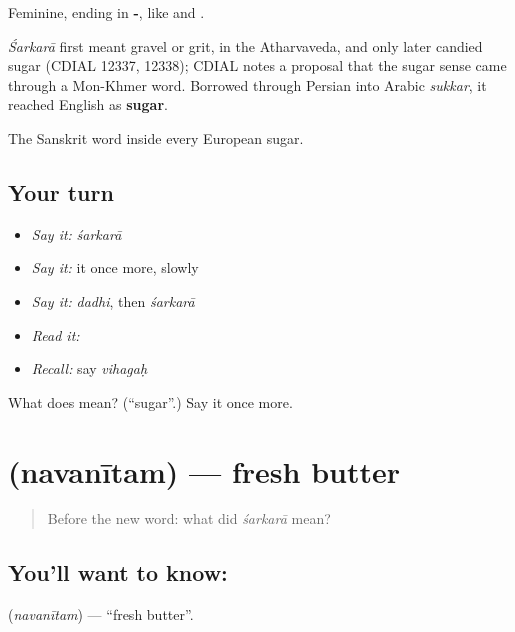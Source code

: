 Feminine, ending in \textbf{-}, like  and .

\begin{cousinweb}
\emph{Śarkarā} first meant gravel or grit, in the Atharvaveda, and only later candied sugar (CDIAL 12337, 12338); CDIAL notes a proposal that the sugar sense came through a Mon-Khmer word. Borrowed through Persian into Arabic \emph{sukkar}, it reached English as \textbf{sugar}.
\end{cousinweb}

\begin{grammarlens}[title={What you've built}]
The Sanskrit word inside every European sugar.
\end{grammarlens}

\subsection*{Your turn}
\begin{itemize}
\raggedright
  \item \emph{Say it:} \emph{śarkarā}
  \item \emph{Say it:} it once more, slowly
  \item \emph{Say it:} \emph{dadhi}, then \emph{śarkarā}
  \item \emph{Read it:} \textbf{}
  \item \emph{Recall:} say \emph{vihagaḥ}
\end{itemize}

\begin{tcolorbox}[breakable,colback=teal!4,colframe=teal!35!black,title={Before you move on}]
What does  mean? (\textquotedblleft{}sugar\textquotedblright{}.) Say it once more.
\end{tcolorbox}
\section[\texorpdfstring{\sk{नवनीतम्} (navanītam)}{नवनीतम् (navanītam)}]{ (navanītam) — fresh butter}

\label{lesson:SA-C40-butter}



\begin{quote}
Before the new word: what did \emph{śarkarā} mean?
\end{quote}

\subsection*{You'll want to know: }
\textbf{} (\emph{navanītam}) — \textquotedblleft{}fresh butter\textquotedblright{}.

